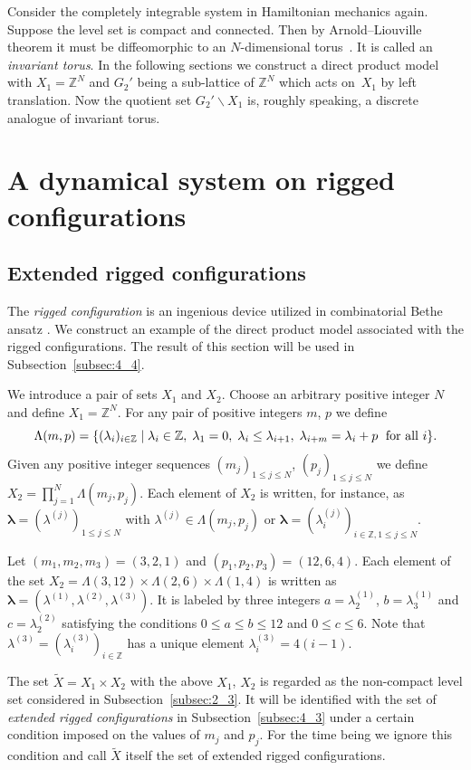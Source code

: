 \documentclass[pdftex]{sigma}
\newcommand{\Z}{{\mathbb Z}}
\newcommand\bol{\boldsymbol{\lambda}}
\begin{document}
Consider the completely integrable system in Hamiltonian mechanics again.
Suppose the level set is compact and connected.
Then by Arnold--Liouville theorem it must be dif\/feomorphic to an $N$-dimensional torus~\cite{A}.
It is called an \textit{invariant torus}.
In the following sections we construct a direct product model
with $X_1 = \Z^N$ and $G_2'$ being a sub-lattice of $\Z^N$
which acts on~$X_1$ by left translation.
Now the quotient set $G_2' \backslash X_1$ is, roughly speaking, a discrete
analogue of invariant torus.

\section{A dynamical system on rigged conf\/igurations}\label{sec:3}
\subsection{Extended rigged conf\/igurations}\label{subsec:3_1}

The \textit{rigged configuration}
is an ingenious device utilized in combinatorial Bethe ansatz \cite{KKR,KR}.
We construct an example of the direct product model
associated with the rigged conf\/igurations.
The result of this section will be used in Subsection~\ref{subsec:4_4}.

We introduce a pair of sets $X_1$ and $X_2$.
Choose an arbitrary positive integer $N$ and def\/ine $X_1 = \Z^N$.
For any pair of positive integers $m$, $p$ we def\/ine
\begin{equation}\label{eq:may1_1}
\Lambda (m,p) = \{(\lambda_i)_{i \in \Z} \mid
\lambda_i \in \Z, \; \lambda_1 = 0, \; \lambda_i \le \lambda_{i+1}, \; \lambda_{i+m} = \lambda_i + p\;
\hbox{ for all } i \}.
\end{equation}
Given any positive integer sequences $(m_j)_{1 \leq j \leq N}$, $(p_j)_{1 \leq j \leq N}$
we def\/ine $X_2 = \prod_{j=1}^N \Lambda (m_j,p_j)$.
Each element of $X_2$ is written, for instance, as
$\bol = (\lambda^{(j)})_{1 \leq j \leq N}$ with $\lambda^{(j)} \in \Lambda (m_j,p_j)$
or $\bol = (\lambda^{(j)}_i)_{i \in \Z, 1 \leq j \leq N}$.

\begin{example}\label{ex:oct13_1}
Let $(m_1, m_2, m_3) = (3,2,1)$ and $(p_1, p_2, p_3) = (12,6,4)$.
Each element of the set $X_2 = \Lambda (3,12) \times \Lambda (2,6) \times \Lambda (1,4)$
is written as $\bol = (\lambda^{(1)}, \lambda^{(2)},\lambda^{(3)})$.
It is labeled by {three} integers $a=\lambda^{(1)}_2$, $b=\lambda^{(1)}_3$
and $c=\lambda^{(2)}_2$ satisfying the conditions $0 \leq a \leq b \leq 12$ and $0 \leq c \leq 6$.
Note that $\lambda^{(3)} = (\lambda^{(3)}_i)_{i \in \Z}$ has {a unique} element $\lambda^{(3)}_i = 4 (i-1)$.
\end{example}
The set $\tilde{X} = X_1 \times X_2$ with the above $X_1$, $X_2$ is regarded as the non-compact level set
considered in Subsection~\ref{subsec:2_3}.
It will be identif\/ied with the set of {\em extended rigged configurations} in Subsection~\ref{subsec:4_3}
under a certain condition imposed on the values of $m_j$ and $p_j$.
For the time being we ignore this condition and call $\tilde{X}$ itself the set of extended rigged conf\/igurations.
\end{document}

